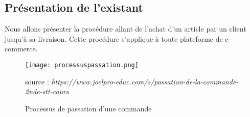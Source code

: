 \subsection{Présentation de l’existant}

Nous allons présenter la procédure allant de l’achat d’un article par un client jusqu’à sa livraison. Cette procédure s’applique à toute plateforme de e-commerce. 
\begin{figure}[H]
	\centering
	\texttt{[image: processuspassation.png]}
	\caption{Processus de passation d'une commande}{ \begin{center} source : \textit{https://www.joelpro-educ.com/s/passation-de-la-commande-2nde-stt-cours} \end{center}}
	\label{fig:processus}
\end{figure}

